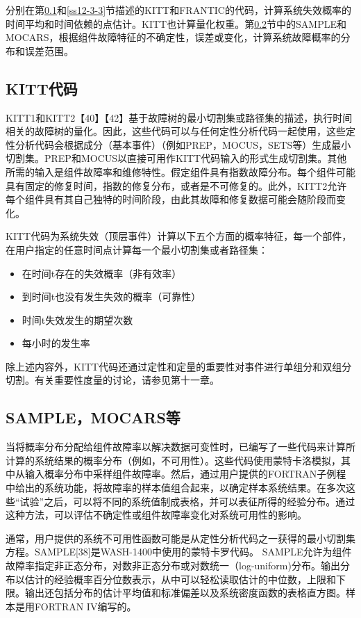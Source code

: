 \documentclass[cn,11pt,chinese]{elegantbook}
\begin{document}
{分别在第\ref{ss12-3-1}和\ref{ss12-3-3}节描述的KITT和FRANTIC的代码，计算系统失效概率的时间平均和时间依赖的点估计。KITT也计算量化权重。第\ref{ss12-3-2}节中的SAMPLE和MOCARS，根据组件故障特征的不确定性，误差或变化，计算系统故障概率的分布和误差范围。

\subsection{KITT代码} \label{ss12-3-1}

KITT1和KITT2【40】【42】基于故障树的最小切割集或路径集的描述，执行时间相关的故障树的量化。因此，这些代码可以与任何定性分析代码一起使用，这些定性分析代码会根据成分（基本事件）（例如PREP，MOCUS，SETS等）生成最小切割集。PREP和MOCUS以直接可用作KITT代码输入的形式生成切割集。其他所需的输入是组件故障率和维修特性。假定组件具有指数故障分布。每个组件可能具有固定的修复时间，指数的修复分布，或者是不可修复的。此外，KITT2允许每个组件具有其自己独特的时间阶段，由此其故障和修复数据可能会随阶段而变化。

KITT代码为系统失效（顶层事件）计算以下五个方面的概率特征，每一个部件，在用户指定的任意时间点计算每一个最小切割集或者路径集：

\begin{itemize}
	\item  在时间t存在的失效概率（非有效率）
\item  到时间t也没有发生失效的概率（可靠性）
\item 时间t失效发生的期望次数
\item  每小时的发生率
\end{itemize}

除上述内容外，KITT代码还通过定性和定量的重要性对事件进行单组分和双组分切割。有关重要性度量的讨论，请参见第十一章。

\subsection{SAMPLE，MOCARS等}\label{ss12-3-2}

当将概率分布分配给组件故障率以解决数据可变性时，已编写了一些代码来计算所计算的系统结果的概率分布（例如，不可用性）。这些代码使用蒙特卡洛模拟，其中从输入概率分布中采样组件故障率。然后，通过用户提供的FORTRAN子例程中给出的系统功能，将故障率的样本值组合起来，以确定样本系统结果。在多次这些“试验”之后，可以将不同的系统值制成表格，并可以表征所得的经验分布。通过这种方法，可以评估不确定性或组件故障率变化对系统可用性的影响。

通常，用户提供的系统不可用性函数可能是从定性分析代码之一获得的最小切割集方程。SAMPLE[38]是WASH-1400中使用的蒙特卡罗代码。 SAMPLE允许为组件故障率指定非正态分布，对数非正态分布或对数统一（log-uniform)分布。输出分布以估计的经验概率百分位数表示，从中可以轻松读取估计的中位数，上限和下限。输出还包括分布的估计平均值和标准偏差以及系统密度函数的表格直方图。样本是用FORTRAN IV编写的。

}
\end{document}
